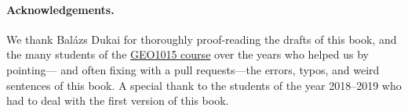 \paragraph*{Acknowledgements.}
We thank Balázs Dukai for thoroughly proof-reading the drafts of this book, and the many students of the \href{https://3d.bk.tudelft.nl/courses/geo1015/}{GEO1015 course} over the years who helped us by pointing--- and often fixing with a pull requests---the errors, typos, and weird sentences of this book. 
A special thank to the students of the year 2018--2019 who had to deal with the first version of this book.






